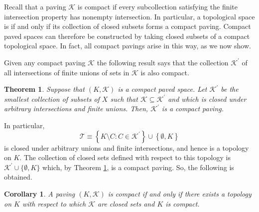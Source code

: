 \documentclass[12pt]{article}
\newtheorem*{corollary*}{Corollary}
\newtheorem{theorem}{Theorem}
\begin{document}

Recall that a paving $\mathcal{K}$ is compact if every subcollection satisfying the finite intersection property has nonempty intersection. In particular, a topological space is  if and only if its collection of closed subsets forms a compact paving. Compact paved spaces can therefore be constructed by taking closed subsets of a compact topological space. In fact, all compact pavings arise in this way, as we now show.

Given any compact paving $\mathcal{K}$ the following result says that the collection $\mathcal{K}^\prime$ of all intersections of finite unions of sets in $\mathcal{K}$ is also compact.

\begin{theorem}\label{thm:1}
Suppose that $(K,\mathcal{K})$ is a compact paved space. Let $\mathcal{K}^\prime$ be the smallest collection of subsets of $X$ such that $\mathcal{K}\subseteq\mathcal{K}^\prime$ and which is closed under arbitrary intersections and finite unions.
Then, $\mathcal{K}^\prime$ is a compact paving.
\end{theorem}
In particular,
\begin{equation*}
\mathcal{T}\equiv\left\{K\setminus C\colon C\in\mathcal{K}^\prime\right\}\cup\left\{\emptyset,K\right\}
\end{equation*}
is closed under arbitrary unions and finite intersections, and hence is a topology on $K$.
The collection of closed sets defined with respect to this topology is $\mathcal{K}^\prime\cup\{\emptyset,K\}$ which, by Theorem \ref{thm:1}, is a compact paving. So, the following is obtained.
\begin{corollary*}
A paving $(K,\mathcal{K})$ is compact if and only if there exists a topology on $K$ with respect to which $\mathcal{K}$ are closed sets and $K$ is compact.
\end{corollary*}

\end{document}
